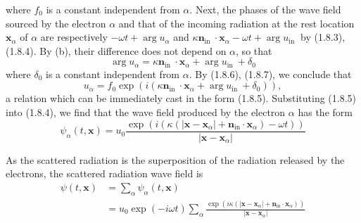 \documentclass{article}
\begin{document}
where $f_{0}$ is a constant independent from $\alpha$. Next, the phases of the wave field sourced by the electron $\alpha$ and that of the incoming radiation at the rest location $\boldsymbol{x}_{\alpha}$ of $\alpha$ are respectively $-\omega t+\arg u_{\alpha}$ and $\kappa \boldsymbol{n}_{\text {in }} \cdot \boldsymbol{x}_{\alpha}-\omega t+\arg u_{\text {in }}$ by (1.8.3), (1.8.4). By (b), their difference does not depend on $\alpha$, so that
$$
\begin{equation*}
\arg u_{\alpha}=\kappa \boldsymbol{n}_{\text {in }} \cdot \boldsymbol{x}_{\alpha}+\arg u_{\text {in }}+\delta_{0} \tag{1.8.7}
\end{equation*}
$$
where $\delta_{0}$ is a constant independent from $\alpha$. By (1.8.6), (1.8.7), we conclude that
$$
\begin{equation*}
u_{\alpha}=f_{0} \exp \left(i\left(\kappa \boldsymbol{n}_{\text {in }} \cdot \boldsymbol{x}_{\alpha}+\arg u_{\text {in }}+\delta_{0}\right)\right), \tag{1.8.8}
\end{equation*}
$$
a relation which can be immediately cast in the form (1.8.5).
Substituting (1.8.5) into (1.8.4), we find that the wave field produced by the electron $\alpha$ has the form
$$
\begin{equation*}
\psi_{\alpha}(t, \boldsymbol{x})=u_{0} \frac{\exp \left(i\left(\kappa\left(\left|\boldsymbol{x}-\boldsymbol{x}_{\alpha}\right|+\boldsymbol{n}_{\mathrm{in}} \cdot \boldsymbol{x}_{\alpha}\right)-\omega t\right)\right)}{\left|\boldsymbol{x}-\boldsymbol{x}_{\alpha}\right|} \tag{1.8.9}
\end{equation*}
$$

As the scattered radiation is the superposition of the radiation released by the electrons, the scattered radiation wave field is
$$
\begin{align*}
\psi(t, \boldsymbol{x}) & =\sum_{\alpha} \psi_{\alpha}(t, \boldsymbol{x})  \tag{1.8.10}\\
& =u_{0} \exp (-i \omega t) \sum_{\alpha} \frac{\exp \left(i \kappa\left(\left|\boldsymbol{x}-\boldsymbol{x}_{\alpha}\right|+\boldsymbol{n}_{\mathrm{in}} \cdot \boldsymbol{x}_{\alpha}\right)\right)}{\left|\boldsymbol{x}-\boldsymbol{x}_{\alpha}\right|}
\end{align*}
$$
\end{document}
